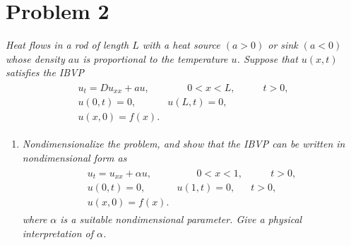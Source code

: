 \documentclass[paper=a4, fontsize=11pt]{scrartcl} %
\theoremstyle{plain}
\numberwithin{equation}{section} %
\numberwithin{figure}{section} %
\numberwithin{table}{section} %
\begin{document}
\section{Problem 2}
\emph{Heat flows in a rod of length $L$ with a heat source $(a > 0)$ or sink $(a < 0)$ whose density $au$ is proportional to the temperature $u$.  Suppose that $u(x,t)$ satisfies the IBVP}
\begin{align*}
    \begin{array}{rrr}
        u_t = Du_{xx} + au, & \qquad 0 < x < L, & \qquad t > 0, \\
        u(0, t) = 0, & u(L, t) = 0, & \\
        u(x, 0) = f(x). & &
    \end{array}
\end{align*}
\begin{enumerate}[\bf (a)]
    \item
        \emph{Nondimensionalize the problem, and show that the IBVP can be written in nondimensional form as}
        \begin{align*}
            \begin{array}{rrr}
                u_t = u_{xx} + \alpha u, & \qquad 0 < x < 1, & \qquad t > 0, \\
                u(0, t) = 0, & u(1, t) = 0, & t > 0, \\
                u(x, 0) = f(x). & &
            \end{array}
        \end{align*}
        \emph{where $\alpha$ is a suitable nondimensional parameter.  Give a physical interpretation of $\alpha$.} \\


\end{enumerate}
\end{document}
